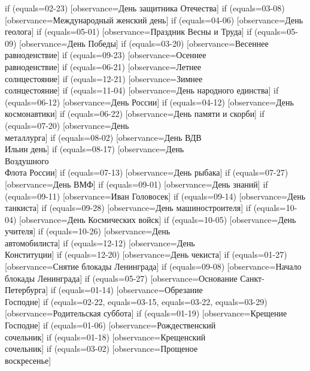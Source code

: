 {  if (equals=02-23) [observance=День защитника Отечества]
  if (equals=03-08) [observance=Международный женский день]
  if (equals=04-06) [observance=День геолога]
  if (equals=05-01) [observance=Праздник Весны и Труда]
  if (equals=05-09) [observance=День Победы]
  if (equals=03-20) [observance=Весеннее\\ равноденствие]
  if (equals=09-23) [observance=Осеннее\\ равноденствие]
  if (equals=06-21) [observance=Летнее\\ солнцестояние]
  if (equals=12-21) [observance=Зимнее\\ солнцестояние]
  if (equals=11-04) [observance=День народного единства]
  if (equals=06-12) [observance=День России]
  if (equals=04-12) [observance=День\\ космонавтики]
  if (equals=06-22) [observance=День памяти и скорби]
  if (equals=07-20) [observance=День\\ металлурга]
  if (equals=08-02) [observance=День ВДВ\\ Ильин день]
  if (equals=08-17) [observance=День\\ Воздушного\\ Флота России]
  if (equals=07-13) [observance=День рыбака]
  if (equals=07-27) [observance=День ВМФ]
  if (equals=09-01) [observance=День знаний]
  if (equals=09-11) [observance=Иван Головосек]
  if (equals=09-14) [observance=День танкиста]
  if (equals=09-28) [observance=День машино\-строителя]
  if (equals=10-04) [observance=День Космических войск]
  if (equals=10-05) [observance=День учителя]
  if (equals=10-26) [observance=День\\ автомобилиста]
  if (equals=12-12) [observance=День\\ Конституции]
  if (equals=12-20) [observance=День чекиста]
  if (equals=01-27) [observance=Снятие блокады Ленинграда]
  if (equals=09-08) [observance=Начало блокады Ленинграда]
  if (equals=05-27) [observance=Основание Санкт-Петербурга]
  if (equals=01-14) [observance=Обрезание\\ Господне]
  if (equals=02-22,
  	equals=03-15,
	equals=03-22,
	equals=03-29) [observance=Родительская суббота]
  if (equals=01-19) [observance=Крещение\\ Господне]
  if (equals=01-06) [observance=Рождественский\\ сочельник]
  if (equals=01-18) [observance=Крещенский\\ сочельник]
  if (equals=03-02) [observance=Прощеное\\ воскресенье]
}
